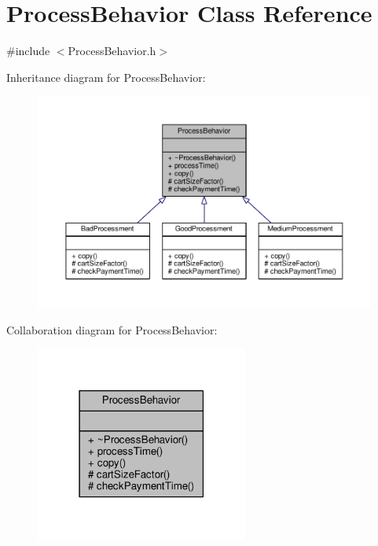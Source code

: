 \hypertarget{classProcessBehavior}{\section{Process\-Behavior Class Reference}
\label{classProcessBehavior}
}


{\ttfamily \#include $<$Process\-Behavior.\-h$>$}



Inheritance diagram for Process\-Behavior\-:\nopagebreak
\begin{figure}[H]
\begin{center}
\leavevmode
\includegraphics[width=350pt]{classProcessBehavior__inherit__graph}
\end{center}
\end{figure}


Collaboration diagram for Process\-Behavior\-:\nopagebreak
\begin{figure}[H]
\begin{center}
\leavevmode
\includegraphics[width=198pt]{classProcessBehavior__coll__graph}
\end{center}
\end{figure}
